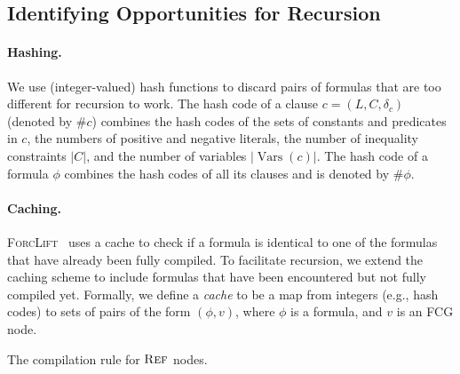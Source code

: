 \documentclass{article}
\theoremstyle{definition}
\theoremstyle{remark}
\DeclareMathOperator{\Reff}{\textsc{Ref}}
\DeclareMathOperator{\Vars}{Vars}
\begin{document}
\subsection{Identifying Opportunities for Recursion}\label{sec:ref}

\paragraph{Hashing.}
We use (integer-valued) hash functions to discard pairs of formulas that are too
different for recursion to work. The hash code of a clause
$c = (L, C, \delta_{c})$ (denoted by $\# c$) combines the hash codes of the sets
of constants and predicates in $c$, the numbers of positive and negative
literals, the number of inequality constraints $|C|$, and the number of
variables $|\Vars(c)|$. The hash code of a formula $\phi$ combines the hash
codes of all its clauses and is denoted by $\#\phi$.

\paragraph{Caching.}
\textsc{ForcLift}~\cite{DBLP:conf/ijcai/BroeckTMDR11} uses a cache to check if
a formula is identical to one of the formulas that have already been fully
compiled. To facilitate recursion, we extend the caching scheme to include
formulas that have been encountered but not fully compiled yet. Formally, we
define a \emph{cache} to be a map from integers (e.g., hash codes) to sets of
pairs of the form $(\phi, v)$, where $\phi$ is a formula, and $v$ is an FCG
node.

\begin{algorithm}[t]
  \caption{The compilation rule for $\Reff$ nodes.}\label{alg:trycache}

  \ForEach{formula and node $(\psi, v) \in C(\#\phi)$}{\label{line:selectformula}
    $\rho \gets \identifyRecursion{$\phi$, $\psi$}$\;
    \lIf{$\rho \ne {\normalfont \texttt{null}}$}{\Return{$\{\, (\Reff_\rho(v), \langle\rangle) \,\}$}}\label{line:rho}
  }
  \Return{$\emptyset$}\;

\end{algorithm}
\end{document}
